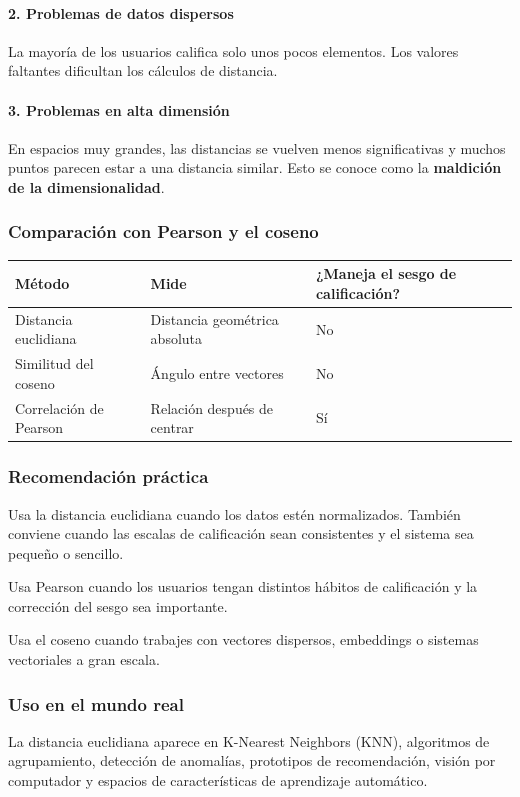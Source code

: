 \documentclass[12pt]{article}
\begin{document}
\paragraph{2. Problemas de datos dispersos} La mayoría de los usuarios califica solo unos pocos elementos. Los valores faltantes dificultan los cálculos de distancia.

\paragraph{3. Problemas en alta dimensión} En espacios muy grandes, las distancias se vuelven menos significativas y muchos puntos parecen estar a una distancia similar. Esto se conoce como la \textbf{maldición de la dimensionalidad}.

\subsubsection*{Comparación con Pearson y el coseno}
\begin{center}
\begin{tabular}{|>{\raggedright\arraybackslash}p{4.15cm}|>{\raggedright\arraybackslash}p{4.15cm}|>{\raggedright\arraybackslash}p{4.15cm}|}
\hline
Método & Mide & ¿Maneja el sesgo de calificación? \\
\hline
Distancia euclidiana & Distancia geométrica absoluta & No \\
Similitud del coseno & Ángulo entre vectores & No \\
Correlación de Pearson & Relación después de centrar & Sí \\
\hline
\end{tabular}
\end{center}

\subsubsection*{Recomendación práctica}
Usa la distancia euclidiana cuando los datos estén normalizados.
También conviene cuando las escalas de calificación sean consistentes y el sistema sea pequeño o sencillo.

Usa Pearson cuando los usuarios tengan distintos hábitos de calificación y la corrección del sesgo sea importante.

Usa el coseno cuando trabajes con vectores dispersos, embeddings o sistemas vectoriales a gran escala.

\subsubsection*{Uso en el mundo real}
La distancia euclidiana aparece en K-Nearest Neighbors (KNN), algoritmos de agrupamiento, detección de anomalías, prototipos de recomendación, visión por computador y espacios de características de aprendizaje automático.
\end{document}
